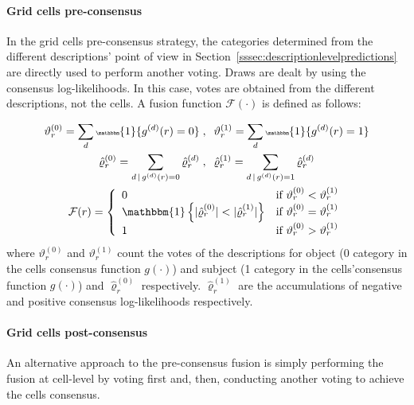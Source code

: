 \documentclass[10pt,twocolumn,letterpaper]{article}
\begin{document}
\paragraph{Grid cells pre-consensus}

In the grid cells pre-consensus strategy, the categories determined from the different descriptions' point of view in Section~\ref{sssec:descriptionlevelpredictions} are directly used to perform another voting. Draws are dealt by using the consensus log-likelihoods. In this case, votes are obtained from the different descriptions, not the cells. A fusion function $\mathcal{F}(\cdot)$ is defined as follows:

\begin{gather*}\tiny
\vartheta_r^{(0)} = \sum_{d} \mathbbm{1}\{ g^{(d)}(r) = 0 \} \; , \;\; \vartheta_r^{(1)} = \sum_{d} \mathbbm{1}\{ g^{(d)}(r) = 1 \} \\
\hat{\varrho}_r^{(0)} = \sum_{d \,|\, g^{(d)}(r) = 0} \hat{\varrho}_r^{(d)} \; , \;\; \hat{\varrho}_r^{(1)}  =\sum_{d \,|\, g^{(d)}(r) = 1} \hat{\varrho}_r^{(d)} \\
\mathcal{F}(r) =
\left\{
	\begin{array}{ll}
		0  &  \mbox{if } \vartheta_r^{(0)} < \vartheta_r^{(1)}   \\
		\mathbbm{1}\left\{ | \hat{\varrho}_r^{(0)} | < | \hat{\varrho}_r^{(1)} | \right\} &  \mbox{if } \vartheta_r^{(0)} = \vartheta_r^{(1)}   \\
		1 &  \mbox{if } \vartheta_r^{(0)} > \vartheta_r^{(1)}   \\
	\end{array}
\right.
\end{gather*}
where $\vartheta_r^{(0)}$ and $\vartheta_r^{(1)}$ count the votes of the descriptions for object (0 category in the cells consensus function $g(\cdot)$) and subject (1 category in the cells'consensus function $g(\cdot)$) and $\hat{\varrho}_r^{(0)}$ respectively. $\hat{\varrho}_r^{(1)}$ are the accumulations of negative and positive consensus log-likelihoods respectively.

\paragraph{Grid cells post-consensus}

An alternative approach to the pre-consensus fusion is simply performing the fusion at cell-level by voting first and, then, conducting another voting to achieve the cells consensus.
\end{document}
